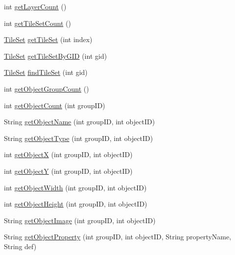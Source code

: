 \begin{DoxyCompactItemize}
\item 
int \mbox{\hyperlink{classorg_1_1newdawn_1_1slick_1_1tiled_1_1_tiled_map_a0d39d942ba61034ae79dfa9cec23905c}{get\+Layer\+Count}} ()
\item 
int \mbox{\hyperlink{classorg_1_1newdawn_1_1slick_1_1tiled_1_1_tiled_map_a349e3cf63beff71c33ae39a451dff398}{get\+Tile\+Set\+Count}} ()
\item 
\mbox{\hyperlink{classorg_1_1newdawn_1_1slick_1_1tiled_1_1_tile_set}{Tile\+Set}} \mbox{\hyperlink{classorg_1_1newdawn_1_1slick_1_1tiled_1_1_tiled_map_a3a39c575b5073bbb6bef273d27b3e73a}{get\+Tile\+Set}} (int index)
\item 
\mbox{\hyperlink{classorg_1_1newdawn_1_1slick_1_1tiled_1_1_tile_set}{Tile\+Set}} \mbox{\hyperlink{classorg_1_1newdawn_1_1slick_1_1tiled_1_1_tiled_map_acc1970d3267b2e382887f081242a8979}{get\+Tile\+Set\+By\+G\+ID}} (int gid)
\item 
\mbox{\hyperlink{classorg_1_1newdawn_1_1slick_1_1tiled_1_1_tile_set}{Tile\+Set}} \mbox{\hyperlink{classorg_1_1newdawn_1_1slick_1_1tiled_1_1_tiled_map_a136e9d5ff92016dcfaf8effa027147a2}{find\+Tile\+Set}} (int gid)
\item 
int \mbox{\hyperlink{classorg_1_1newdawn_1_1slick_1_1tiled_1_1_tiled_map_aa39650c84fe749bbe63ee1f65a80df20}{get\+Object\+Group\+Count}} ()
\item 
int \mbox{\hyperlink{classorg_1_1newdawn_1_1slick_1_1tiled_1_1_tiled_map_a445ccc51d54dfa01c589de1c957cce0c}{get\+Object\+Count}} (int group\+ID)
\item 
String \mbox{\hyperlink{classorg_1_1newdawn_1_1slick_1_1tiled_1_1_tiled_map_a4d3d91d20ab0a138825576fc0ccf0e51}{get\+Object\+Name}} (int group\+ID, int object\+ID)
\item 
String \mbox{\hyperlink{classorg_1_1newdawn_1_1slick_1_1tiled_1_1_tiled_map_a3403ac0fbe6152da4ed10ab85cd9a6bd}{get\+Object\+Type}} (int group\+ID, int object\+ID)
\item 
int \mbox{\hyperlink{classorg_1_1newdawn_1_1slick_1_1tiled_1_1_tiled_map_a1f3254dc5845b361c2cbde74f587d4c1}{get\+ObjectX}} (int group\+ID, int object\+ID)
\item 
int \mbox{\hyperlink{classorg_1_1newdawn_1_1slick_1_1tiled_1_1_tiled_map_a690410873e8b1ddcf677545432fb44f7}{get\+ObjectY}} (int group\+ID, int object\+ID)
\item 
int \mbox{\hyperlink{classorg_1_1newdawn_1_1slick_1_1tiled_1_1_tiled_map_afa4bb340b71651c7ac0b0a372f22ab60}{get\+Object\+Width}} (int group\+ID, int object\+ID)
\item 
int \mbox{\hyperlink{classorg_1_1newdawn_1_1slick_1_1tiled_1_1_tiled_map_a2da39e5d72913b52ebb5a12397724f96}{get\+Object\+Height}} (int group\+ID, int object\+ID)
\item 
String \mbox{\hyperlink{classorg_1_1newdawn_1_1slick_1_1tiled_1_1_tiled_map_a831cc73584eada0493627505cba1a42a}{get\+Object\+Image}} (int group\+ID, int object\+ID)
\item 
String \mbox{\hyperlink{classorg_1_1newdawn_1_1slick_1_1tiled_1_1_tiled_map_ac73d3772b22f8fc9e200b9f3db40116c}{get\+Object\+Property}} (int group\+ID, int object\+ID, String property\+Name, String def)
\end{DoxyCompactItemize}
